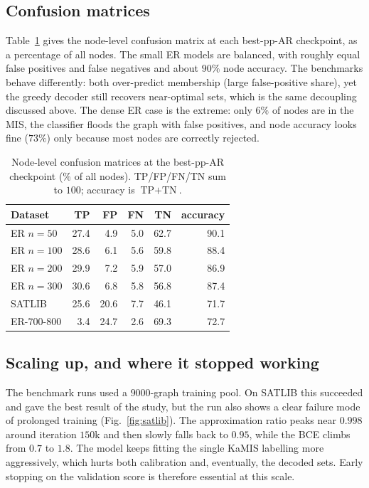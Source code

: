 \documentclass[10pt,a4paper]{article}
\newcommand{\ppar}{\mathrm{pp\text{-}AR}}
\begin{document}
\subsection{Confusion matrices}

Table~\ref{tab:cm} gives the node-level confusion matrix at each best-$\ppar$
checkpoint, as a percentage of all nodes. The small ER models are balanced, with
roughly equal false positives and false negatives and about $90\%$ node accuracy.
The benchmarks behave differently: both over-predict membership (large false-positive
share), yet the greedy decoder still recovers near-optimal sets, which is the same
decoupling discussed above. The dense ER case is the extreme: only $6\%$ of nodes
are in the MIS, the classifier floods the graph with false positives, and node
accuracy looks fine ($73\%$) only because most nodes are correctly rejected.

\begin{table}[h]
\centering
\small
\caption{Node-level confusion matrices at the best-$\ppar$ checkpoint
(\% of all nodes). TP/FP/FN/TN sum to $100$; accuracy is $\text{TP}+\text{TN}$.}
\label{tab:cm}
\begin{tabular}{lrrrrr}
\toprule
Dataset & TP & FP & FN & TN & accuracy \\
\midrule
ER $n{=}50$    & 27.4 & 4.9  & 5.0 & 62.7 & 90.1 \\
ER $n{=}100$   & 28.6 & 6.1  & 5.6 & 59.8 & 88.4 \\
ER $n{=}200$   & 29.9 & 7.2  & 5.9 & 57.0 & 86.9 \\
ER $n{=}300$   & 30.6 & 6.8  & 5.8 & 56.8 & 87.4 \\
\midrule
SATLIB         & 25.6 & 20.6 & 7.7 & 46.1 & 71.7 \\
ER-700-800     & 3.4  & 24.7 & 2.6 & 69.3 & 72.7 \\
\bottomrule
\end{tabular}
\end{table}

\subsection{Scaling up, and where it stopped working}

The benchmark runs used a $9000$-graph training pool. On SATLIB this succeeded and
gave the best result of the study, but the run also shows a clear failure mode of
prolonged training (Fig.~\ref{fig:satlib}). The approximation ratio peaks near
$0.998$ around iteration $150$k and then slowly falls back to $0.95$, while the BCE
climbs from $0.7$ to $1.8$. The model keeps fitting the single KaMIS labelling more
aggressively, which hurts both calibration and, eventually, the decoded sets. Early
stopping on the validation score is therefore essential at this scale.
\end{document}
